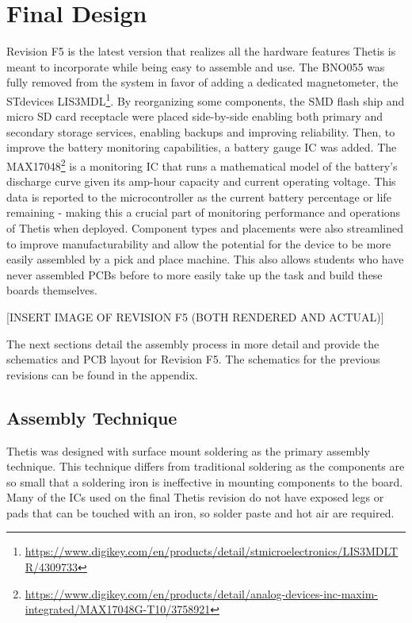 \section{Final Design} 
Revision F5 is the latest version that realizes all the hardware features Thetis is meant to incorporate while being easy to assemble and use.
The BNO055 was fully removed from the system in favor of adding a dedicated magnetometer, the STdevices LIS3MDL\footnote{\url{https://www.digikey.com/en/products/detail/stmicroelectronics/LIS3MDLTR/4309733}}.
By reorganizing some components, the SMD flash ship and micro SD card receptacle were placed side-by-side enabling both primary and secondary storage services, enabling backups and improving reliability.
Then, to improve the battery monitoring capabilities, a battery gauge IC was added.
The MAX17048\footnote{\url{https://www.digikey.com/en/products/detail/analog-devices-inc-maxim-integrated/MAX17048G-T10/3758921}} is a monitoring IC that runs a mathematical model of the battery's discharge curve given its amp-hour capacity and current operating voltage.
This data is reported to the microcontroller as the current battery percentage or life remaining - making this a crucial part of monitoring performance and operations of Thetis when deployed.
Component types and placements were also streamlined to improve manufacturability and allow the potential for the device to be more easily assembled by a pick and place machine.
This also allows students who have never assembled PCBs before to more easily take up the task and build these boards themselves.

[INSERT IMAGE OF REVISION F5 (BOTH RENDERED AND ACTUAL)]

The next sections detail the assembly process in more detail and provide the schematics and PCB layout for Revision F5.
The schematics for the previous revisions can be found in the appendix.



\subsection{Assembly Technique} 
Thetis was designed with surface mount soldering as the primary assembly technique.
This technique differs from traditional soldering as the components are so small that a soldering iron is ineffective in mounting components to the board.
Many of the ICs used on the final Thetis revision do not have exposed legs or pads that can be touched with an iron, so solder paste and hot air are required.

